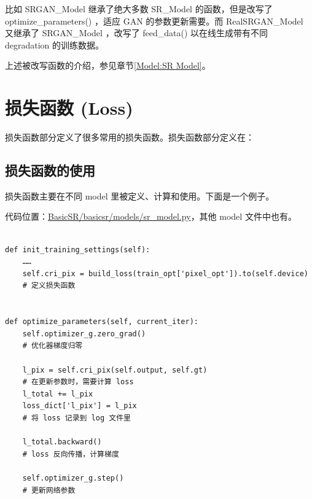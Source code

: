 \documentclass[../main.tex]{subfiles}
\begin{document}
比如 SRGAN\_Model 继承了绝大多数 SR\_Model 的函数，但是改写了 optimize\_parameters() ，适应 GAN 的参数更新需要。而 RealSRGAN\_Model 又继承了 SRGAN\_Model ，改写了 feed\_data() 以在线生成带有不同 degradation 的训练数据。

\begin{note} %
    上述被改写函数的介绍，参见章节\ref{Model:SR Model}。
\end{note}


\section{损失函数 (Loss)}\label{code_structure:loss}

损失函数部分定义了很多常用的损失函数。损失函数部分定义在：
\subsection{损失函数的使用}

损失函数主要在不同 model 里被定义、计算和使用。下面是一个例子。

代码位置：\href{https://github.com/XPixelGroup/BasicSR/blob/master/basicsr/models/sr_model.py}{BasicSR/basicsr/models/sr\_model.py}，其他 model 文件中也有。

\begin{verbatim}

def init_training_settings(self):
    ……
    self.cri_pix = build_loss(train_opt['pixel_opt']).to(self.device)
    # 定义损失函数


def optimize_parameters(self, current_iter):
    self.optimizer_g.zero_grad()
    # 优化器梯度归零

    l_pix = self.cri_pix(self.output, self.gt)
    # 在更新参数时，需要计算 loss
    l_total += l_pix
    loss_dict['l_pix'] = l_pix
    # 将 loss 记录到 log 文件里

    l_total.backward()
    # loss 反向传播，计算梯度

    self.optimizer_g.step()
    # 更新网络参数
\end{verbatim}
\end{document}
